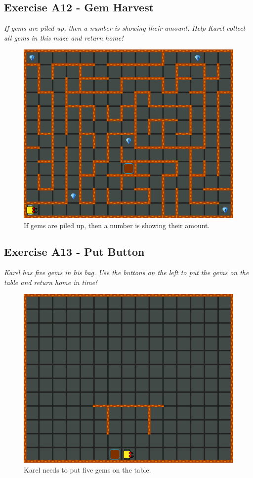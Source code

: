 \subsection{Exercise A12 - Gem Harvest}

{\em If gems are piled up, then a number is showing their amount. 
Help Karel collect all gems in this maze and return home!}\\[-7mm]

\begin{figure}[!ht]
\begin{center}
\includegraphics[height=0.4\textwidth]{imgk/a12.png}
\end{center}
\vspace{-4mm}
\caption{If gems are piled up, then a number is showing their amount.}
\label{fig:a12}
\vspace{-10mm}
\end{figure}
\noindent
\newpage

\subsection{Exercise A13 - Put Button}

{\em Karel has five gems in his bag. Use the buttons on the left to put the gems on the table and 
return home in time!}\\[-7mm]

\begin{figure}[!ht]
\begin{center}
\includegraphics[height=0.4\textwidth]{imgk/a13.png}
\end{center}
\vspace{-4mm}
\caption{Karel needs to put five gems on the table.}
\label{fig:a13}
\vspace{-4mm}
\end{figure}
\noindent

